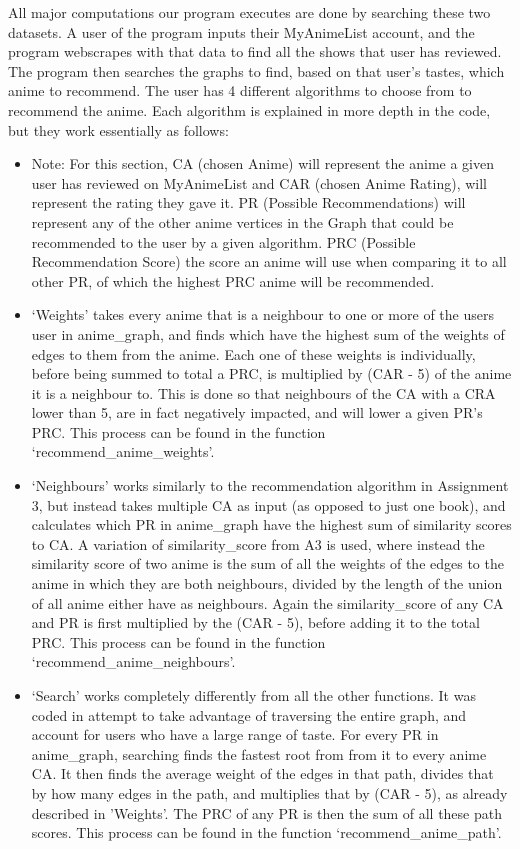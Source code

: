 \documentclass[fontsize=11pt]{article}
\begin{document}
\item[]All major computations our program executes are done by searching these two datasets. A user of the program inputs their MyAnimeList account, and the program webscrapes with that data to find all the shows that user has reviewed. The program then searches the graphs to find, based on that user's tastes, which anime to recommend. The user has 4 different algorithms to choose from to recommend the anime. Each algorithm is explained in more depth in the code, but they work essentially as follows: 
\begin{itemize}
    \item Note: For this section, CA (chosen Anime) will represent the anime a given user has reviewed on MyAnimeList and CAR (chosen Anime Rating), will represent the rating they gave it. PR (Possible Recommendations) will represent any of the other anime vertices in the Graph that could be recommended to the user by a given algorithm. PRC (Possible Recommendation Score) the score an anime will use when comparing it to all other PR, of which the highest PRC anime will be recommended.
    \item ‘Weights’ takes every anime that is a neighbour to one or more of the users user in anime\_graph, and finds which have the highest sum of the weights of edges to them from the anime. Each one of these weights is individually, before being summed to total a PRC, is multiplied by (CAR - 5) of the anime it is a neighbour to. This is done so that neighbours of the CA with a CRA lower than 5, are in fact negatively impacted, and will lower a given PR's PRC. This process can be found in the function `recommend\_anime\_weights'. 
    \item ‘Neighbours’ works similarly to the recommendation algorithm in Assignment 3, but instead takes multiple CA as input (as opposed to just one book), and calculates which PR in anime\_graph have the highest sum of similarity scores to CA. A variation of similarity\_score from A3 is used, where instead the similarity score of two anime is the sum of all the weights of the edges to the anime in which they are both neighbours, divided by the length of the union of all anime either have as neighbours. Again the similarity\_score of any CA and PR is first multiplied by the (CAR - 5), before adding it to the total PRC. This process can be found in the function `recommend\_anime\_neighbours'. 
    \item ‘Search’ works completely differently from all the other functions. It was coded in attempt to take advantage of traversing the entire graph, and account for users who have a large range of taste. For every PR in anime\_graph, searching finds the fastest root from from it to every anime CA. It then finds the average weight of the edges in that path, divides that by how many edges in the path, and multiplies that by (CAR - 5), as already described in 'Weights'. The PRC of any PR is then the sum of all these path scores. This process can be found in the function `recommend\_anime\_path'. 

\end{itemize}
\end{document}
